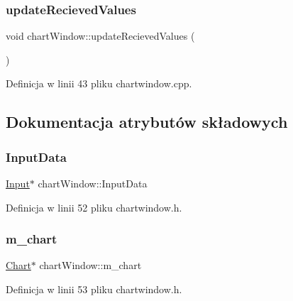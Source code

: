 \subsubsection{\texorpdfstring{update\+Recieved\+Values}{updateRecievedValues}}
{\footnotesize\ttfamily void chart\+Window\+::update\+Recieved\+Values (\begin{DoxyParamCaption}{ }\end{DoxyParamCaption})\hspace{0.3cm}{\ttfamily [slot]}}



Definicja w linii 43 pliku chartwindow.\+cpp.



\subsection{Dokumentacja atrybutów składowych}
\mbox{\label{classchart_window_ae779978e0ea70d11bc4324e6bb448641}} 
\subsubsection{\texorpdfstring{Input\+Data}{InputData}}
{\footnotesize\ttfamily \hyperlink{class_input}{Input}$\ast$ chart\+Window\+::\+Input\+Data\hspace{0.3cm}{\ttfamily [private]}}



Definicja w linii 52 pliku chartwindow.\+h.

\mbox{\label{classchart_window_ab91e89e2af69240eaa9834f3df7b3e71}} 
\subsubsection{\texorpdfstring{m\+\_\+chart}{m\_chart}}
{\footnotesize\ttfamily \hyperlink{class_chart}{Chart}$\ast$ chart\+Window\+::m\+\_\+chart\hspace{0.3cm}{\ttfamily [private]}}



Definicja w linii 53 pliku chartwindow.\+h.

\mbox{\label{classchart_window_af045aa91399d39e818b8c50242449a63}} 
